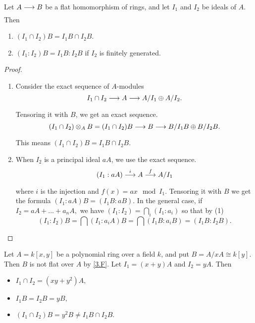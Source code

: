 \documentclass[../main]{subfiles}
\begin{document}
\newparagraph Let $A \varrightarrow{} B$ be a flat homomorphism of rings, and let $I_1$ and $I_2$ be ideals of $A.$ Then 
\begin{enumerate} [label=(\arabic*)]
    \item $(I_1 \cap I_2)B = I_1B \cap I_2B$.
    \item $(I_1 : I_2)B = I_1B : I_2B $ if $I_2$ is finitely generated.
\end{enumerate}

\begin{proof} 
    \begin{enumerate} [label=(\arabic*)]
        \item Consider the exact sequence of $A$-modules 
            \[
                I_1 \cap I_2 \varrightarrow{} A \varrightarrow{} A/ I_1 \oplus A/ I_2.
            \] 
            Tensoring it with $B$, we get an exact sequence. 
            \[
                (I_1 \cap I_2) \otimes_A B = (I_1\cap I_2)B \varrightarrow{} B \varrightarrow{} B/ I_1B \oplus B/ I_2B.
            \] 
            This means $(I_1 \cap I_2)B = I_1B \cap I_2B.$
        \item When $I_2$ is a principal ideal $aA$, we use the exact sequence. 
            \[
                (I_1:aA) \varrightarrow{i} A \varrightarrow{f} A/ I_1
            \] 
            where $i$ is the injection and $f(x) = ax \mod I_1$. Tensoring it with $B$ we get the formula $(I_1:aA)B = (I_1B:aB)$. In the general case, if $I_2=aA+ \ldots + a_nA,$ we have $(I_1:I_2) = \bigcap_i (I_1:a_i)$ so that by (1)
            \[
                (I_1 : I_2)B = \bigcap (I_1:a_iA)B = \bigcap (I_1B:a_iB) = (I_1B:I_2B).
            \] 
    \end{enumerate}
\end{proof}

\begin{parexample}     
    Let $A = k[x,y]$ be a polynomial ring over a field $k$, and put $B = A/ xA \cong k[y]$. Then $B$ is not flat over $A$ by \ref{3.F}. Let $I_1 = (x+y)A$ and $I_2=yA$. Then 
    \begin{itemize}
        \item  $I_1\cap I_2 = (xy + y^{2})A,$
        \item  $I_1B = I_2B = yB,$
        \item $(I_1 \cap I_2)B = y^{2}B \neq I_1B \cap I_2B.$
    \end{itemize}
\end{parexample}
\end{document}

